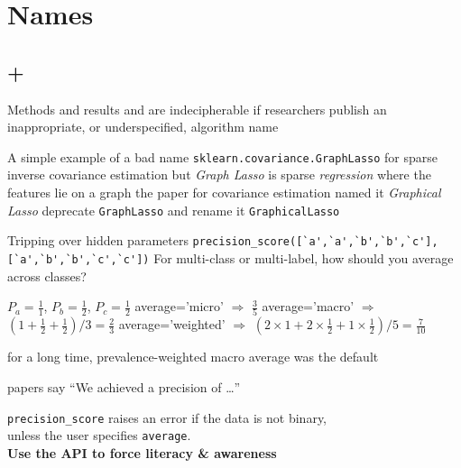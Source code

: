 \documentclass[aspectratio=169, 22pt]{beamer}
\newcommand{\hl}{\textcolor{usydred}}
\newenvironment{sectionslide}
			{\subsection*{+}\begin{frame}[fragile,environment=sectionslide]\vfill\begin{center}\Large}
			{\end{center}\vfill\end{frame}}
\begin{document}

\section{Names}

\begin{sectionslide}
	Methods and results and are indecipherable if researchers publish an inappropriate, or underspecified, algorithm name
\end{sectionslide}


\begin{points}{A simple example of a bad name}
	\p \verb|sklearn.covariance.GraphLasso| for sparse inverse covariance estimation
	\p but \emph{Graph Lasso} is sparse \emph{regression} where the features lie on a graph
	\p the paper for covariance estimation named it \emph{Graphical Lasso}
	\pause
	\p[Solution] deprecate \verb|GraphLasso| and rename it \verb|GraphicalLasso|
\end{points}

\begin{points}{Tripping over hidden parameters}
	\p 
\verb|precision_score([`a',`a',`b',`b',`c'], [`a',`b',`b',`c',`c'])|
	\p For multi-class or multi-label, how should you average across classes?
	\begin{itemize}
\p $P_a = \frac{1}{1}$, $P_b = \frac{1}{2}$, $P_c = \frac{1}{2}$
\p average='micro' $\Rightarrow$ $\frac{3}{5}$
\p average='macro' $\Rightarrow$ $(1 + \frac{1}{2} + \frac{1}{2}) / 3 = \frac{2}{3}$
\p average='weighted' $\Rightarrow$ $(2\times1 + 2\times\frac{1}{2} + 1\times\frac{1}{2}) / 5 = \frac{7}{10}$
	\end{itemize}
	\p for a long time, prevalence-weighted macro average was the default
	\begin{itemize}
	\p[$\therefore$] papers say ``We achieved a precision of \dots''
	\end{itemize}
	\pause
\p[Solution] \verb|precision_score| raises an error if the data is not binary,\\
unless the user specifies \verb|average|. \\ \hfill \textbf{\hl{Use the API to force literacy \& awareness}}
\end{points}

\end{document}
